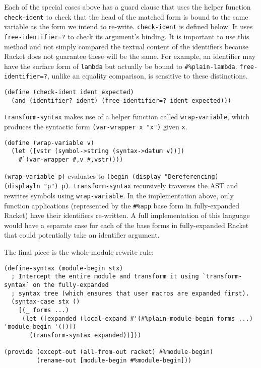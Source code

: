 \documentclass{article}
\begin{document}
Each of the special cases above has a guard clause that uses the helper function \texttt{check-ident} to check that the head of the matched form is bound to the same variable as the form we intend to re-write. \texttt{check-ident} is defined below. It uses \texttt{free-identifier=?} to check its argument's binding. It is important to use this method and not simply compared the textual content of the identifiers because Racket does not guarantee these will be the same. For example, an identifier may have the surface form of \texttt{lambda} but actually be bound to \texttt{\#\%plain-lambda}. \texttt{free-identifier=?}, unlike an equality comparison, is sensitive to these distinctions.

\begin{lstlisting}
(define (check-ident ident expected)
  (and (identifier? ident) (free-identifier=? ident expected)))
\end{lstlisting}

\texttt{transform-syntax} makes use of a helper function called \texttt{wrap-variable}, which produces the syntactic form \texttt{(var-wrapper x "x")} given \texttt{x}.

\begin{lstlisting}
(define (wrap-variable v)
  (let ([vstr (symbol->string (syntax->datum v))])
    #`(var-wrapper #,v #,vstr))))
\end{lstlisting}

\texttt{(wrap-variable p)} evaluates to \texttt{(begin (display "Dereferencing) (displayln "p") p)}. \texttt{transform-syntax} recursively traverses the AST and rewrites symbols using \texttt{wrap-variable}. In the implementation above, only function applications (represented by the \texttt{\#\%app} base form in fully-expanded Racket) have their identifiers re-written. A full implementation of this language would have a separate case for each of the base forms in fully-expanded Racket that could potentially take an identifier argument.

The final piece is the whole-module rewrite rule:

\begin{lstlisting}
(define-syntax (module-begin stx)
  ; Intercept the entire module and transform it using `transform-syntax` on the fully-expanded
  ; syntax tree (which ensures that user macros are expanded first).
  (syntax-case stx ()
    [(_ forms ...)
     (let ([expanded (local-expand #'(#%plain-module-begin forms ...) 'module-begin '())])
       (transform-syntax expanded))]))

(provide (except-out (all-from-out racket) #%module-begin)
         (rename-out [module-begin #%module-begin]))
\end{lstlisting}
\end{document}
